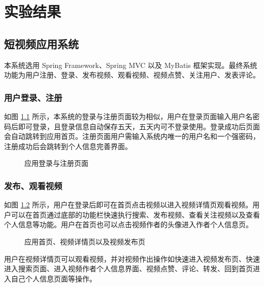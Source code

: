 \chapter{实验结果}\label{sec:experiment}

\section{短视频应用系统}
本系统选用 Spring Framework、Spring MVC 以及 MyBatis 框架实现。最终系统功能为用户注册、登录、发布视频、观看视频、视频点赞、关注用户、发表评论。

\subsection{用户登录、注册}
如图 \ref{fig:LoginRegister} 所示，本系统的登录与注册页面较为相似，用户在登录页面输入用户名密码后即可登录，且登录信息自动保存五天，五天内可不登录使用。登录成功后页面会自动跳转到应用首页。注册页面用户需输入系统内唯一的用户名和一个强密码，注册成功后会跳转到个人信息完善界面。

\begin{figure}[!ht]
\centering
{}\quad\quad
\subfloat[注册页面]{
	\centering
	\texttt{[image: weapp2]}}
\caption{应用登录与注册页面}
\label{fig:LoginRegister}
\end{figure}


\subsection{发布、观看视频}

如图 \ref{fig:index} 所示，用户在登录后即可在首页点击视频以进入视频详情页观看视频。用户可以在首页通过底部的功能栏快速执行搜索、发布视频、查看关注视频以及查看个人信息等功能。用户在首页也可以点击视频作者的头像进入作者个人信息页。


\begin{figure}[!ht]
\centering
{}\quad\quad
{}\quad\quad
{}
\caption{应用首页、视频详情页以及视频发布页}
\label{fig:index}
\end{figure}

用户在视频详情页可以观看视频，并对视频作出操作如快速进入视频发布页、快速进入搜索页面、进入视频作者个人信息界面、视频点赞、评论、转发、回到首页进入自己个人信息页面等操作。

